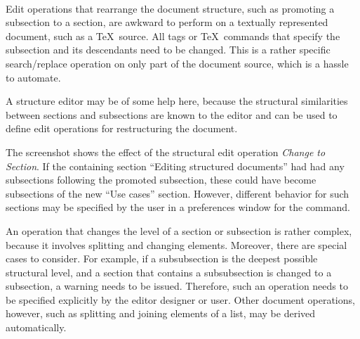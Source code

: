 
\\

Edit operations that rearrange the document structure, such as promoting a subsection to a section, are awkward to perform on a textually represented document, such as a \TeX\ source. All tags or \TeX\ commands that specify the subsection and its descendants need to be changed. This is a rather specific search/replace operation on only part of the document source, which is a hassle to automate.

A structure editor may be of some help here, because the structural similarities between sections and subsections are known to the editor and can be used to define edit operations for restructuring the document.

 
The screenshot shows the effect of the structural edit operation {\em Change to Section}. If the containing section ``Editing structured documents'' had had any subsections following the promoted subsection, these could have become subsections of the new ``Use cases'' section. However, different behavior for such sections may be specified by the user in a preferences window for the command.

An operation that changes the level of a section or subsection is rather complex, because it involves splitting and changing elements. Moreover, there are special cases to consider. For example, if a subsubsection is the deepest possible structural level, and a section that contains a subsubsection is changed to a subsection, a warning needs to be issued. Therefore, such an operation needs to be specified explicitly by the editor designer or user. Other document operations, however, such as splitting and joining elements of a list, may be derived automatically.

